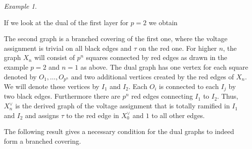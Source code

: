 \documentclass{amsart}
\numberwithin{equation}{section}
\theoremstyle{remark}
\newtheorem{example}[theorem]{Example}
\theoremstyle{plain} %
\begin{document}
\begin{example}
\begin{center}
\end{center}
If we look at the dual of the first layer for $p=2$ we obtain
\begin{center}
\end{center}
The second graph is a branched covering of the first one, where the voltage assignment is trivial on all black edges and $\tau$ on the red one.
For higher $n$, the graph $X_n$ will consist of $p^n$ squares connected by red edges as drawn in the example $p=2$ and $n=1$ as above.
The dual graph has one vertex for each square denoted by $O_1, \dots ,O_{p^n}$ and two additional vertices created by the red edges of $X_n$.
We will denote these vertices by $I_1$ and $I_2$.
Each $O_i$ is connected to each $I_j$ by two black edges. 
Furthermore there are $p^n$ red edges connecting $I_1$ to $I_2$.
Thus, $X_n^\vee$ is the derived graph of the voltage assignment that is totally ramified in $I_1$ and $I_2$ and assigns $\tau$ to the red edge in $X_0^\vee$ and $1$ to all other edges.
\end{example}

{The following result gives a necessary condition for the dual graphs to indeed form a branched covering.}
\end{document}
